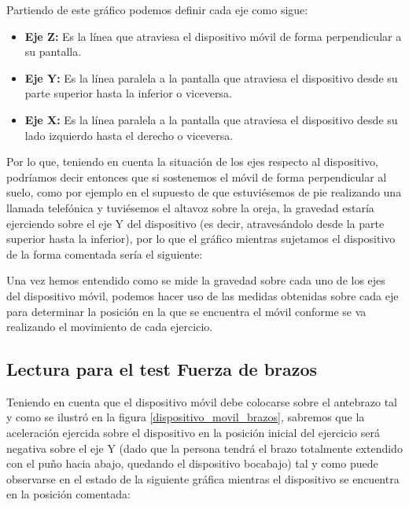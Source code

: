 
Partiendo de este gráfico podemos definir cada eje como sigue:

\begin{itemize}
\item \textbf{Eje Z:} Es la línea que atraviesa el dispositivo móvil de forma perpendicular a su pantalla.
\item \textbf{Eje Y:} Es la línea paralela a la pantalla que atraviesa el dispositivo desde su parte superior hasta la inferior o viceversa.
\item \textbf{Eje X:} Es la línea paralela a la pantalla que atraviesa el dispositivo desde su lado izquierdo hasta el derecho o viceversa.
\end{itemize}

Por lo que, teniendo en cuenta la situación de los ejes respecto al dispositivo, podríamos decir entonces que si sostenemos el móvil de forma perpendicular al suelo, como por ejemplo en el supuesto de que estuviésemos de pie realizando una llamada telefónica y tuviésemos el altavoz sobre la oreja, la gravedad estaría ejerciendo sobre el eje Y del dispositivo (es decir, atravesándolo desde la parte superior hasta la inferior), por lo que el gráfico mientras sujetamos el dispositivo de la forma comentada sería el siguiente:


Una vez hemos entendido como se mide la gravedad sobre cada uno de los ejes del dispositivo móvil, podemos hacer uso de las medidas obtenidas sobre cada eje para determinar la posición en la que se encuentra el móvil conforme se va realizando el movimiento de cada ejercicio.

\subsection{Lectura para el test Fuerza de brazos}

Teniendo en cuenta que el dispositivo móvil debe colocarse sobre el antebrazo tal y como se ilustró en la figura \ref{dispositivo_movil_brazos}, sabremos que la aceleración ejercida sobre el dispositivo en la posición inicial del ejercicio será negativa sobre el eje Y (dado que la persona tendrá el brazo totalmente extendido con el puño hacia abajo, quedando el dispositivo bocabajo) tal y como puede observarse en el estado de la siguiente gráfica mientras el dispositivo se encuentra en la posición comentada:

